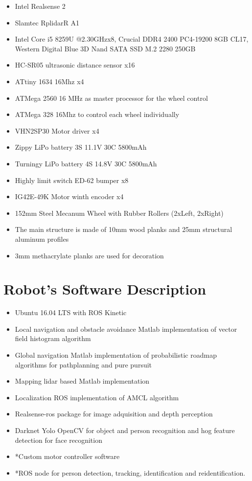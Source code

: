 \begin{itemize}[nosep]
	\item Intel Realsense 2
  \item Slamtec RplidarR A1 
  \item Intel Core i5 8259U @2.30GHzx8, Crucial DDR4 2400 PC4-19200 8GB CL17, Western Digital Blue 3D Nand SATA SSD M.2 2280 250GB
  \item HC-SR05 ultrasonic distance sensor x16
  \item ATtiny 1634 16Mhz x4
  \item ATMega 2560 16 MHz as master processor for the wheel control
  \item ATMega 328 16Mhz to control each wheel individually
  \item VHN2SP30 Motor driver x4
  \item Zippy LiPo battery 3S 11.1V 30C 5800mAh 
  \item Turningy LiPo battery 4S 14.8V 30C 5800mAh 
  \item Highly limit switch ED-62 bumper x8
  \item IG42E-49K Motor winth encoder x4
  \item 152mm Steel Mecanum Wheel with Rubber Rollers (2xLeft, 2xRight)
  \item The main structure is made of 10mm wood planks and 25mm structural aluminum profiles
  \item 3mm methacrylate planks are used for decoration
\end{itemize}

\section*{Robot's Software Description}

\begin{itemize}[nosep]
	\item Ubuntu 16.04 LTS with ROS Kinetic
  \item Local navigation and obstacle avoidance Matlab implementation of vector field histogram algorithm
  \item Global navigation Matlab implementation of probabilistic roadmap algorithms for pathplanning and pure pursuit
  \item Mapping lidar based Matlab implementation
  \item Localization ROS implementation of AMCL algorithm
  \item Realsense-ros package for image adquisition and depth perception
  \item Darknet Yolo OpenCV for object and person recognition and hog feature detection for face recognition
  \item *Custom motor controller software
  \item *ROS node for person detection, tracking, identification and reidentification.
\end{itemize}


